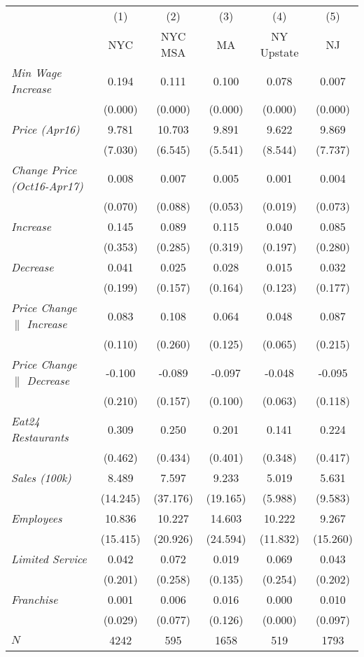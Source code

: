 \begin{center}
\begin{tabular}{lccccc}
\hline  & (1) & (2) & (3) & (4) & (5)\\
 & NYC & NYC MSA & MA & NY Upstate & NJ\\
\hline  \textit{Min Wage Increase}  & 0.194 & 0.111 & 0.100 & 0.078 & 0.007\\
  & (0.000) & (0.000) & (0.000) & (0.000) & (0.000)\\
 \textit{Price (Apr16)}  & 9.781 & 10.703 & 9.891 & 9.622 & 9.869\\
  & (7.030) & (6.545) & (5.541) & (8.544) & (7.737)\\
 \textit{Change Price (Oct16-Apr17)}  & 0.008 & 0.007 & 0.005 & 0.001 & 0.004\\
  & (0.070) & (0.088) & (0.053) & (0.019) & (0.073)\\
 \textit{Increase}  & 0.145 & 0.089 & 0.115 & 0.040 & 0.085\\
  & (0.353) & (0.285) & (0.319) & (0.197) & (0.280)\\
 \textit{Decrease}  & 0.041 & 0.025 & 0.028 & 0.015 & 0.032\\
  & (0.199) & (0.157) & (0.164) & (0.123) & (0.177)\\
 \textit{Price Change $\|$ Increase}  & 0.083 & 0.108 & 0.064 & 0.048 & 0.087\\
  & (0.110) & (0.260) & (0.125) & (0.065) & (0.215)\\
 \textit{Price Change $\|$ Decrease}  & -0.100 & -0.089 & -0.097 & -0.048 & -0.095\\
  & (0.210) & (0.157) & (0.100) & (0.063) & (0.118)\\
 \textit{Eat24 Restaurants}  & 0.309 & 0.250 & 0.201 & 0.141 & 0.224\\
  & (0.462) & (0.434) & (0.401) & (0.348) & (0.417)\\
 \textit{Sales (100k)}  & 8.489 & 7.597 & 9.233 & 5.019 & 5.631\\
  & (14.245) & (37.176) & (19.165) & (5.988) & (9.583)\\
 \textit{Employees} & 10.836 & 10.227 & 14.603 & 10.222 & 9.267\\
  & (15.415) & (20.926) & (24.594) & (11.832) & (15.260)\\
 \textit{Limited Service}  & 0.042 & 0.072 & 0.019 & 0.069 & 0.043\\
  & (0.201) & (0.258) & (0.135) & (0.254) & (0.202)\\
 \textit{Franchise}  & 0.001 & 0.006 & 0.016 & 0.000 & 0.010\\
  & (0.029) & (0.077) & (0.126) & (0.000) & (0.097)\\
\hline  $ N $  & 4242 & 595 & 1658 & 519 & 1793\\
\hline\end{tabular}\\
\end{center}
